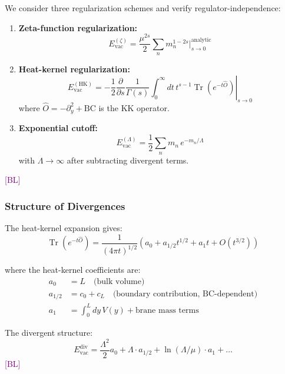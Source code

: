 \documentclass[11pt,a4paper]{article}
\newcommand{\tagBL}{\textcolor{purple}{[BL]}}
\DeclareMathOperator{\Tr}{Tr}
\begin{document}
We consider three regularization schemes and verify regulator-independence:

\begin{enumerate}
\item \textbf{Zeta-function regularization:}
\begin{equation}
\label{eq:reg-zeta}
E_{\text{vac}}^{(\zeta)} = \frac{\mu^{2s}}{2} \sum_n m_n^{1-2s} \bigg|_{s \to 0}^{\text{analytic}}
\end{equation}

\item \textbf{Heat-kernel regularization:}
\begin{equation}
\label{eq:reg-heat}
E_{\text{vac}}^{(\text{HK})} = -\frac{1}{2} \frac{\partial}{\partial s} \left. \frac{1}{\Gamma(s)}
\int_0^\infty dt\, t^{s-1} \Tr(e^{-t\hat{O}}) \right|_{s \to 0}
\end{equation}
where $\hat{O} = -\partial_y^2 + \text{BC}$ is the KK operator.

\item \textbf{Exponential cutoff:}
\begin{equation}
\label{eq:reg-exp}
E_{\text{vac}}^{(\Lambda)} = \frac{1}{2} \sum_n m_n \, e^{-m_n/\Lambda}
\end{equation}
with $\Lambda \to \infty$ after subtracting divergent terms.
\end{enumerate}

\tagBL

\subsubsection{Structure of Divergences}

The heat-kernel expansion gives:
\begin{equation}
\label{eq:heat-kernel-exp}
\Tr(e^{-t\hat{O}}) = \frac{1}{(4\pi t)^{1/2}} \left( a_0 + a_{1/2} t^{1/2} + a_1 t + O(t^{3/2}) \right)
\end{equation}

where the heat-kernel coefficients are:
\begin{align}
\label{eq:a0}
a_0 &= L \quad \text{(bulk volume)} \\
\label{eq:a12}
a_{1/2} &= c_0 + c_L \quad \text{(boundary contribution, BC-dependent)} \\
\label{eq:a1}
a_1 &= \int_0^L dy\, V(y) + \text{brane mass terms}
\end{align}

The divergent structure:
\begin{equation}
\label{eq:div-structure}
E_{\text{vac}}^{\text{div}} = \frac{\Lambda^2}{2} a_0 + \Lambda \cdot a_{1/2} + \ln(\Lambda/\mu) \cdot a_1 + \ldots
\end{equation}
\tagBL
\end{document}
